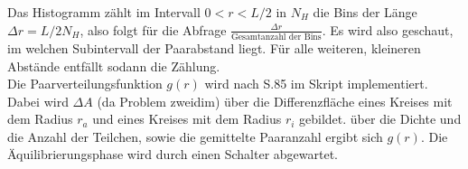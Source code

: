 Das Histogramm zählt im Intervall $0<r<L/2$ in $N_H$ die Bins der Länge $\Delta r = L / 2 N_H$, also folgt für die Abfrage $\frac{\Delta r}{\text{Gesamtanzahl der Bins}}$. Es wird also geschaut, im welchen Subintervall der Paarabstand liegt. Für alle weiteren, kleineren Abstände entfällt sodann die Zählung.\\

Die Paarverteilungsfunktion $g(r)$ wird nach S.85 im Skript implementiert. Dabei wird $\Delta A$ (da Problem zweidim) über die Differenzfläche eines Kreises mit dem Radius $r_a$ und eines Kreises mit dem Radius $r_i$ gebildet. über die Dichte und die Anzahl der Teilchen, sowie die gemittelte Paaranzahl ergibt sich $g(r)$. Die Äquilibrierungsphase wird durch einen Schalter abgewartet.



